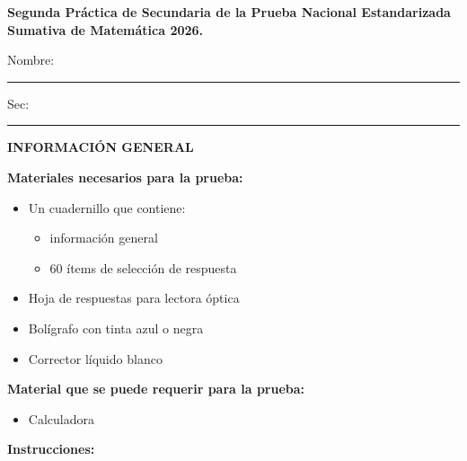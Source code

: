 \documentclass[11pt]{article}
\begin{document}
\begin{center}
{\large \textbf{Segunda Pr\'actica de Secundaria de la Prueba Nacional Estandarizada Sumativa de Matem\'atica 2026.}}
\end{center}

\noindent Nombre: \rule{8cm}{0.4pt}\hfill Sec: \rule{3cm}{0.4pt}

\vspace{6pt}
\noindent\textbf{INFORMACI\'ON GENERAL}

\vspace{4pt}
\noindent\textbf{Materiales necesarios para la prueba:}

\begin{itemize}[leftmargin=1.6em, itemsep=1pt, topsep=2pt, parsep=0pt]
  \item Un cuadernillo que contiene:
  \begin{itemize}[leftmargin=1.6em, itemsep=0pt, topsep=1pt, parsep=0pt, label=$\blacklozenge$]
    \item informaci\'on general
    \item 60 \'items de selecci\'on de respuesta
  \end{itemize}
  \item Hoja de respuestas para lectora \'optica
  \item Bol\'igrafo con tinta azul o negra
  \item Corrector l\'iquido blanco
\end{itemize}

\noindent\textbf{Material que se puede requerir para la prueba:}

\begin{itemize}[leftmargin=1.6em, itemsep=1pt, topsep=2pt, parsep=0pt]
  \item Calculadora
\end{itemize}

\vspace{4pt}
\noindent\textbf{Instrucciones:}
\end{document}
